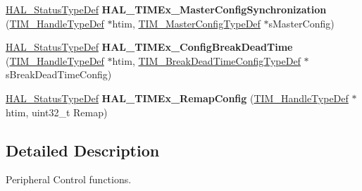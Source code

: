 \begin{DoxyCompactItemize}
\hyperlink{stm32f4xx__hal__def_8h_a63c0679d1cb8b8c684fbb0632743478f}{H\+A\+L\+\_\+\+Status\+Type\+Def} {\bfseries H\+A\+L\+\_\+\+T\+I\+M\+Ex\+\_\+\+Master\+Config\+Synchronization} (\hyperlink{struct_t_i_m___handle_type_def}{T\+I\+M\+\_\+\+Handle\+Type\+Def} $\ast$htim, \hyperlink{struct_t_i_m___master_config_type_def}{T\+I\+M\+\_\+\+Master\+Config\+Type\+Def} $\ast$s\+Master\+Config)
\item 
\mbox{\label{group___t_i_m_ex___exported___functions___group5_ga4414f3b3dcbed3f21ee3b06d6db9ffa4}} 
\hyperlink{stm32f4xx__hal__def_8h_a63c0679d1cb8b8c684fbb0632743478f}{H\+A\+L\+\_\+\+Status\+Type\+Def} {\bfseries H\+A\+L\+\_\+\+T\+I\+M\+Ex\+\_\+\+Config\+Break\+Dead\+Time} (\hyperlink{struct_t_i_m___handle_type_def}{T\+I\+M\+\_\+\+Handle\+Type\+Def} $\ast$htim, \hyperlink{struct_t_i_m___break_dead_time_config_type_def}{T\+I\+M\+\_\+\+Break\+Dead\+Time\+Config\+Type\+Def} $\ast$s\+Break\+Dead\+Time\+Config)
\item 
\mbox{\label{group___t_i_m_ex___exported___functions___group5_ga683118282daf3aa2e319eb8eea93af31}} 
\hyperlink{stm32f4xx__hal__def_8h_a63c0679d1cb8b8c684fbb0632743478f}{H\+A\+L\+\_\+\+Status\+Type\+Def} {\bfseries H\+A\+L\+\_\+\+T\+I\+M\+Ex\+\_\+\+Remap\+Config} (\hyperlink{struct_t_i_m___handle_type_def}{T\+I\+M\+\_\+\+Handle\+Type\+Def} $\ast$htim, uint32\+\_\+t Remap)
\end{DoxyCompactItemize}


\subsection{Detailed Description}
Peripheral Control functions. 

